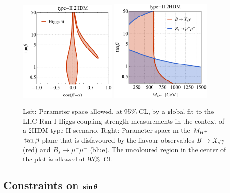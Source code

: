 \documentclass[a4paper, 11pt,notoc]{article}
\def\bm#1{\mbox{\boldmath$#1$\unboldmath}}
\begin{document}
\begin{figure}[t!]
\centering
\includegraphics[width=0.435\textwidth]{figure3l.pdf} \qquad 
\includegraphics[width=0.45\textwidth]{figure3r.pdf}
\vspace{4mm}
\caption{\label{fig:higgsflavourfit} Left: Parameter space allowed, at 95\% CL, by a global fit to the LHC Run-I Higgs coupling strength measurements in the context of a 2HDM type-II scenario. Right: Parameter space in the $M_{H^\pm}\hspace{0.5mm}$--$\hspace{0.5mm}\tan \beta$ plane that is disfavoured by the flavour observables $B \to X_s \gamma$ (red) and $B_s \to \mu^+ \mu^-$ (blue). The uncoloured region in the center of the plot is allowed at 95\%~CL. }
\end{figure}

\subsection{Constraints on $\bm{\sin \theta}$}
\end{document}
